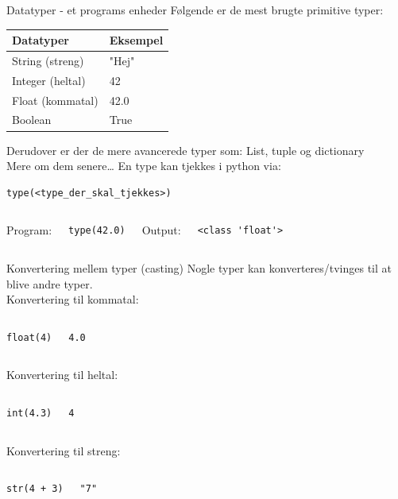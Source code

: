 \documentclass{beamer}
\begin{document}
\begin{frame}[fragile]{Datatyper - et programs enheder}
Følgende er de mest brugte primitive typer: 
\begin{center}
\begin{tabular}{ll}
\hline
Datatyper			&		Eksempel 	\\ \hline \hline
String (streng)		&		"Hej"		\\
Integer (heltal)	&		42			\\
Float (kommatal)	&		42.0		\\
Boolean				&		True		\\
\end{tabular}
\end{center}
Derudover er der de mere avancerede typer som: List, tuple og dictionary\\
Mere om dem senere\dots
En type kan tjekkes i python via:
\begin{lstlisting}[style=python]
type(<type_der_skal_tjekkes>)
\end{lstlisting}
\begin{columns}
Program:
\begin{lstlisting}[style=python]
type(42.0)
\end{lstlisting}
Output:
\begin{lstlisting}[style=python]
<class 'float'>
\end{lstlisting}
\end{columns}
\end{frame}

\begin{frame}[fragile]{Konvertering mellem typer (casting)}
Nogle typer kan konverteres/tvinges til at blive andre typer.\\
Konvertering til kommatal:
\begin{columns}
\begin{lstlisting}[style=python]
float(4)
\end{lstlisting}
\begin{lstlisting}[style=python]
4.0
\end{lstlisting}
\end{columns}
Konvertering til heltal:
\begin{columns}
\begin{lstlisting}[style=python]
int(4.3)
\end{lstlisting}
\begin{lstlisting}[style=python]
4
\end{lstlisting}
\end{columns}
Konvertering til streng:
\begin{columns}
\begin{lstlisting}[style=python]
str(4 + 3)
\end{lstlisting}
\begin{lstlisting}[style=python]
"7"
\end{lstlisting}
\end{columns}
\end{frame}
\end{document}

